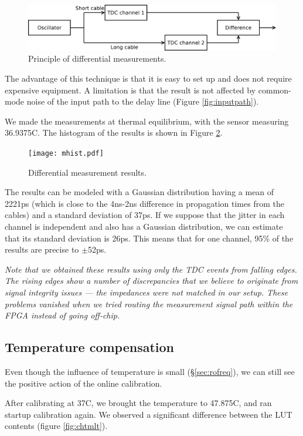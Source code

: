 \documentclass[a4paper,11pt]{article}
\begin{document}
\begin{figure}[H]
\includegraphics[width=\textwidth]{dtdc.pdf}
\caption{Principle of differential measurements.}
\label{fig:dtdc}
\end{figure}

The advantage of this technique is that it is easy to set up and does not require expensive equipment. A limitation is that the result is not affected by common-mode noise of the input path to the delay line (Figure \ref{fig:inputpath}).

We made the measurements at thermal equilibrium, with the sensor measuring 36.9375\degree C. The histogram of the results is shown in Figure \ref{fig:mhist}.

\begin{figure}[H]
\texttt{[image: mhist.pdf]}
\caption{Differential measurement results.}
\label{fig:mhist}
\end{figure}

The results can be modeled with a Gaussian distribution having a mean of 2221ps (which is close to the 4ns-2ns difference in propagation times from the cables) and a standard deviation of 37ps. If we suppose that the jitter in each channel is independent and also has a Gaussian distribution, we can estimate that its standard deviation is 26ps. This means that for one channel, 95\% of the results are precise to $\pm$52ps.

\textit{Note that we obtained these results using only the TDC events from falling edges. The rising edges show a number of discrepancies that we believe to originate from signal integrity issues --- the impedances were not matched in our setup. These problems vanished when we tried routing the measurement signal path within the FPGA instead of going off-chip.}

\subsection{Temperature compensation}
Even though the influence of temperature is small (\S \ref{sec:rofreq}), we can still see the positive action of the online calibration.

After calibrating at 37\degree C, we brought the temperature to 47.875\degree C, and ran startup calibration again. We observed a significant difference between the LUT contents (figure \ref{fig:chtmlt}).
\end{document}
